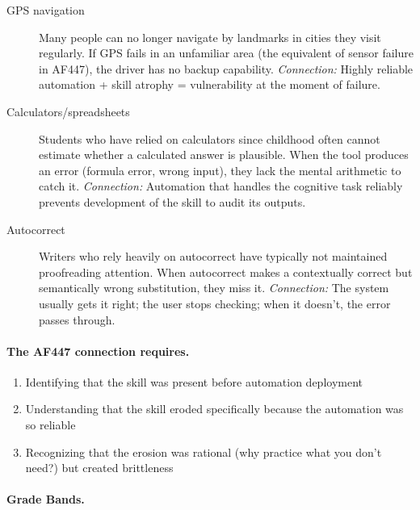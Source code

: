 \begin{description}
    \item[GPS navigation] Many people can no longer navigate by landmarks in cities they visit regularly. If GPS fails in an unfamiliar area (the equivalent of sensor failure in AF447), the driver has no backup capability. \emph{Connection:} Highly reliable automation + skill atrophy = vulnerability at the moment of failure.

    \item[Calculators/spreadsheets] Students who have relied on calculators since childhood often cannot estimate whether a calculated answer is plausible. When the tool produces an error (formula error, wrong input), they lack the mental arithmetic to catch it. \emph{Connection:} Automation that handles the cognitive task reliably prevents development of the skill to audit its outputs.

    \item[Autocorrect] Writers who rely heavily on autocorrect have typically not maintained proofreading attention. When autocorrect makes a contextually correct but semantically wrong substitution, they miss it. \emph{Connection:} The system usually gets it right; the user stops checking; when it doesn't, the error passes through.
\end{description}

\paragraph{The AF447 connection requires.}
\begin{enumerate}
    \item Identifying that the skill was present before automation deployment
    \item Understanding that the skill eroded specifically because the automation was so reliable
    \item Recognizing that the erosion was rational (why practice what you don't need?) but created brittleness
\end{enumerate}

\paragraph{Grade Bands.}

